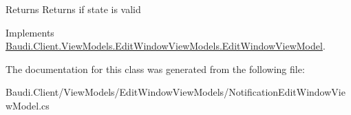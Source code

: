 \begin{DoxyReturn}{Returns}
Returns if state is valid
\end{DoxyReturn}


Implements \hyperlink{class_baudi_1_1_client_1_1_view_models_1_1_edit_window_view_models_1_1_edit_window_view_model_aeae328bfe7608e01ce3c54da0c13f781}{Baudi.\+Client.\+View\+Models.\+Edit\+Window\+View\+Models.\+Edit\+Window\+View\+Model}.



The documentation for this class was generated from the following file\+:\begin{DoxyCompactItemize}
\item 
Baudi.\+Client/\+View\+Models/\+Edit\+Window\+View\+Models/Notification\+Edit\+Window\+View\+Model.\+cs\end{DoxyCompactItemize}
